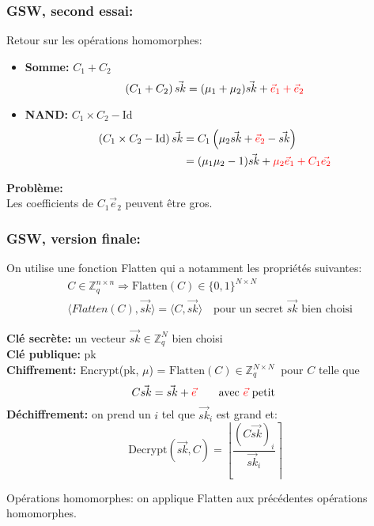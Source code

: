 \documentclass[10pt,xcolor={usenames,dvipsnames}]{beamer}
\newcommand{\ZZq}{\mathbb{Z}_q}
\begin{document}


\begin{frame} 
\frametitle{GSW, second essai:}
Retour sur les opérations homomorphes:
\begin{itemize}
\item \textbf{Somme:} $C_1 + C_2\quad$
\[\left(C_1 + C_2\right) \vec{sk} = (\mu_1 + \mu_2) \vec{sk} + {\color{red}\vec{e}_1 + \vec{e}_2}\]
\item \textbf{NAND:} $C_1 \times C_2 - \text{Id}$
\begin{align*}
\left(C_1 \times C_2 - \text{Id}\right) \vec{sk} &= C_1\left(\mu_2\vec{sk} + {\color{red}\vec{e}_2} - \vec{sk}\right) \\
&= (\mu_1 \mu_2 - 1) \vec{sk} + {\color{red}\mu_2 \vec{e}_1 + C_1 \vec{e_2}}
\end{align*}
\end{itemize}

\textbf{Problème:} \\
Les coefficients de $C_1 \vec{e}_2$ peuvent être gros.

\end{frame} 

  
\begin{frame} 
\frametitle{GSW, version finale:}
On utilise une fonction Flatten qui a notamment les propriétés suivantes:
\begin{align*}
&C \in \ZZq^{n \times n} \Rightarrow \text{Flatten}(C) \in \{0,1\}^{N \times N} \\
& \langle Flatten(C), \vec{sk} \rangle = \langle C, \vec{sk} \rangle \quad\text{pour un secret }\vec{sk}\text{ bien choisi}
\end{align*}

\textbf{Clé secrète:} un vecteur $\vec{sk} \in \ZZq^{N}$ bien choisi\\
\textbf{Clé publique:} pk\\
\textbf{Chiffrement:} Encrypt(pk, $\mu$) = $\text{Flatten}(C)\in \ZZq^{N \times N}\:$ pour $C$ telle que  
\[C \vec{sk} = \vec{sk} + {\color{red}\vec{e}}\qquad \text{avec }  {\color{red}\vec{e}} \text{ petit} \]
\textbf{Déchiffrement:} on prend un $i$ tel que $\vec{sk}_i$ est grand et:
\[\text{Decrypt}(\vec{sk}, C) = \left\lfloor \frac{{\left(C\vec{sk}\right)}_i}{\vec{sk}_i} \right\rceil \]

Opérations homomorphes: on applique Flatten aux précédentes opérations homomorphes.

\end{frame} 
  
\end{document}
